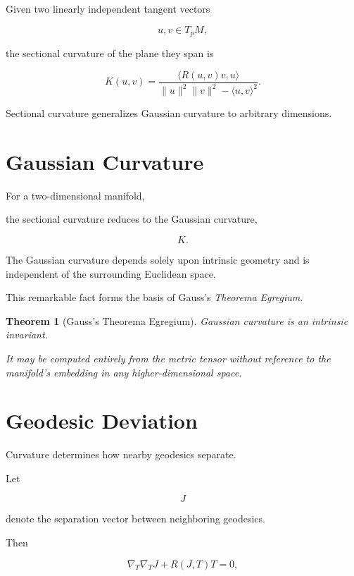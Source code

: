 \documentclass[11pt,fleqn]{book}
\numberwithin{equation}{chapter}
\theoremstyle{plain}
\newtheorem{theorem}{Theorem}[chapter]
\theoremstyle{definition}
\theoremstyle{remark}
\begin{document}
Given two linearly independent tangent vectors

\[
u,v\in T_pM,
\]

the sectional curvature of the plane they span is

\[
\boxed{
K(u,v)
=
\frac{
\langle
R(u,v)v,
u
\rangle
}
{
\|u\|^2\|v\|^2
-
\langle u,v\rangle^2
}.
}
\]

Sectional curvature generalizes Gaussian curvature to arbitrary
dimensions.


\section{Gaussian Curvature}

For a two-dimensional manifold,

the sectional curvature reduces to the Gaussian curvature,

\[
K.
\]

The Gaussian curvature depends solely upon intrinsic geometry and is
independent of the surrounding Euclidean space.

This remarkable fact forms the basis of Gauss's
\emph{Theorema Egregium}.


\begin{theorem}[Gauss's Theorema Egregium]

Gaussian curvature is an intrinsic invariant.

It may be computed entirely from the metric tensor without reference to
the manifold's embedding in any higher-dimensional space.

\end{theorem}


\section{Geodesic Deviation}

Curvature determines how nearby geodesics separate.

Let

\[
J
\]

denote the separation vector between neighboring geodesics.

Then

\[
\boxed{
\nabla_T\nabla_TJ
+
R(J,T)T
=
0,
}
\]
\end{document}
